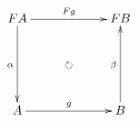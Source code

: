 \documentclass[12pt]{article}
\begin{document}
\pagestyle{empty}

\begin{align*}
  \vcenter{
    \xymatrix@=60pt{
      F A
      \ar@{->}[r]^{F g}
      \ar@{->}[d]_{\alpha}
      \ar@{{}{ }{}}[rd]|{\circlearrowright}
      &
      F B
      \\
      A
      \ar@{->}[r]^{g}
      &
      B
      \ar@{->}[u]^{\beta}
    }
  }
\end{align*}
\end{document}

